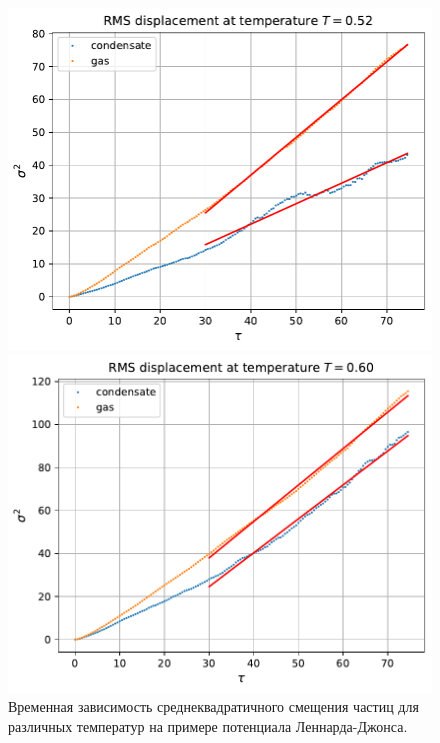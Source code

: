 \documentclass[pdf,hyperref={unicode}]{beamer}
\begin{document}
\begin{frame}
\begin{columns}
\begin{column}{0.55\linewidth}
\begin{figure}[h]
\begin{center}
\begin{minipage}[h]{0.45\linewidth}
\includegraphics[width=\textwidth, keepaspectratio]{diffusion_fit_0.52}
\end{minipage}
\begin{minipage}[h]{0.45\linewidth}
\includegraphics[width=\textwidth, keepaspectratio]{diffusion_fit_0.60}
\end{minipage}
\caption{\tiny Временная зависимость среднеквадратичного смещения частиц для различных температур на примере потенциала Леннарда-Джонса.}
\label{risRMS}
\end{center}
\end{figure}


\end{column}
\end{columns}
\end{frame}
\end{document}
